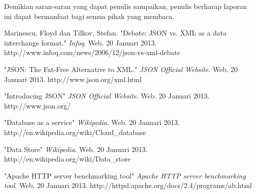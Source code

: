 \documentclass{llncs}
\begin{document}
Demikian saran-saran yang dapat penulis sampaikan, penulis berharap laporan ini dapat bermanfaat bagi semua pihak yang membaca.



%
%

\begin{thebibliography}{1}

Marinescu, Floyd dan Tilkov, Stefan. "Debate: JSON vs. XML as a data interchange format." \emph{Infoq}. Web. 20 Januari 2013. http://www.infoq.com/news/2006/12/json-vs-xml-debate

"JSON: The Fat-Free Alternative to XML." \emph{JSON Official Website}. Web. 20 Januari 2013. http://www.json.org/xml.html

"Introducing JSON" \emph{JSON Official Website}. Web. 20 Januari 2013. http://www.json.org/

"Database as a service" \emph{Wikipedia}. Web. 20 Januari 2013. http://en.wikipedia.org/wiki/Cloud\_database

"Data Store" \emph{Wikipedia}. Web. 20 Januari 2013. http://en.wikipedia.org/wiki/Data\_store

"Apache HTTP server benchmarking tool" \emph{Apache HTTP server benchmarking tool}. Web. 20 Januari 2013. http://httpd.apache.org/docs/2.4/programs/ab.html

\end{thebibliography}
\end{document}
